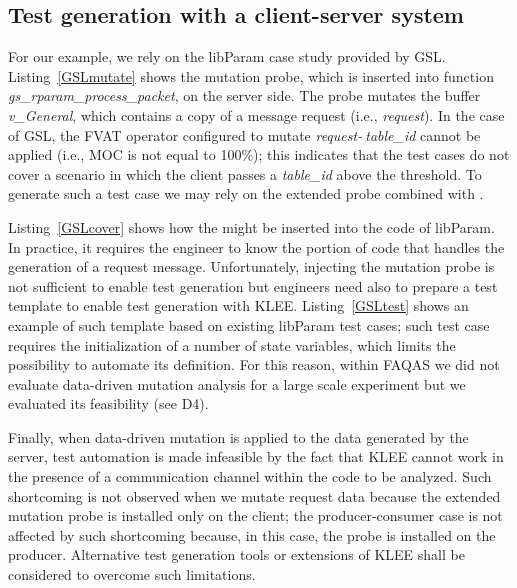 \clearpage
\subsection{Test generation with a client-server system}



For our example, we rely on the libParam case study provided by GSL. Listing~\ref{GSLmutate} shows the mutation probe, which is inserted into function \emph{gs\_rparam\_process\_packet}, on the server side. The probe mutates the buffer \emph{v\_General}, which contains a copy of a message request (i.e., \emph{request}). In the case of GSL, the FVAT operator configured to mutate \emph{request-$\>$table\_id} cannot be applied (i.e., MOC is not equal to 100\%); this indicates that the test cases do not cover a scenario in which the client passes a \emph{table\_id} above the threshold. To generate such a test case we may rely on the extended probe combined with . 

Listing~\ref{GSLcover} shows how the  might be inserted into the code of libParam. In practice, it requires the engineer to know the portion of code that handles the generation of a request message. Unfortunately, injecting the mutation probe is not sufficient to enable test generation but engineers need also to prepare a test template to enable test generation with KLEE. Listing~\ref{GSLtest} shows an example of such template based on existing libParam test cases; such test case requires the initialization of a number of state variables, which limits the possibility to automate its definition. For this reason, within FAQAS we did not evaluate data-driven mutation analysis for a large scale experiment but we evaluated its feasibility (see D4).

Finally, when data-driven mutation is applied to the data generated by the server, test automation is made infeasible by the fact that KLEE cannot work in the presence of a communication channel within the code to be analyzed. Such shortcoming is not observed when we mutate request data because the extended mutation probe is installed only on the client; the producer-consumer case is not affected by such shortcoming because, in this case, the probe is installed on the producer. Alternative test generation tools or extensions of KLEE shall be considered to overcome such limitations.





